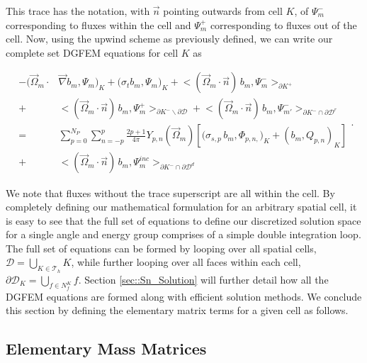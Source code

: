 \noindent This trace has the notation, with $\vec{n}$ pointing outwards from cell $K$, of $\Psi_m^-$ corresponding to fluxes within the cell and $\Psi_m^+$ corresponding to fluxes out of the cell. Now, using the upwind scheme as previously defined, we can write our complete set DGFEM equations for cell $K$ as

\begin{equation}
\label{eq::Sn_DGFEM_trans_eq_cellK_complete}
\begin{aligned}
-  \Big( \vec{\Omega}_m \cdot  & \vec{\nabla} b_m, \Psi_{m} \Big)_{K}   + \Big(  \sigma_{t} b_m ,   \Psi_{m} \Big)_{K} +  \Big< ( \vec{\Omega}_m \cdot \vec{n} ) \, b_m, {\Psi}_m^{-}  \Big>_{\partial K^+}  \\
  + & \Big< ( \vec{\Omega}_m \cdot \vec{n} ) \, b_m, {\Psi}_m^{+}  \Big>_{\partial K^- \backslash \partial \mathcal{D}}  + \Big< ( \vec{\Omega}_m \cdot \vec{n} ) \, b_m, {\Psi}^{-}_{m'}  \Big>_{\partial K^- \cap \partial \mathcal{D}^r}  \\
= & \sum_{p=0}^{N_P} \sum_{n=-p}^{p} \frac{2p + 1}{4 \pi}  Y_{p,n} (  \vec{\Omega}_m ) \left[ \Big( \sigma_{s,p} \, b_m,  \Phi_{p,n,} \Big)_{K}  + \left(  b_m ,   Q_{p,n} \right)_{K} \right] \\
+ & \Big< ( \vec{\Omega}_m \cdot \vec{n} ) \, b_m, {\Psi}_m^{inc}  \Big>_{\partial K^- \cap \partial \mathcal{D}^d}
\end{aligned} .
\end{equation} 

\noindent We note that fluxes without the trace superscript are all within the cell. By completely defining our mathematical formulation for an arbitrary spatial cell, it is easy to see that the full set of equations to define our discretized solution space for a single angle and energy group comprises of a simple double integration loop. The full set of equations can be formed by looping over all spatial cells, $\mathcal{D} = \bigcup_{K \in \mathcal{T}_h} K$, while further looping over all faces within each cell, $\partial \mathcal{D}_K = \bigcup_{ f \in N_f^K} f$. Section \ref{sec::Sn_Solution} will further detail how all the DGFEM equations are formed along with efficient solution methods. We conclude this section by defining the elementary matrix terms for a given cell as follows.

\subsection{Elementary Mass Matrices}
\label{sec::Sn_Spatial_Mass}

